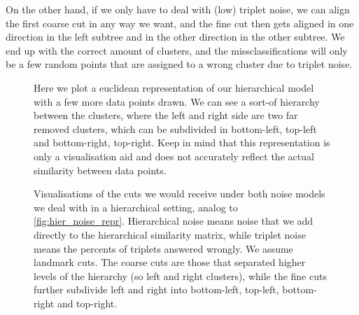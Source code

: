 On the other hand, if we only have to deal with (low) triplet noise, we can align the first coarse cut in any way we want, and the fine cut then gets aligned in one direction in the left subtree
and in the other direction in the other subtree. We end up with the correct amount of clusters, and the missclassifications will only be a few random points that are assigned to a wrong cluster due to triplet noise.


\begin{figure}[ht]
    \centering
    \resizebox{0.8\textwidth}{!}{}
    \caption{
        Here we plot a euclidean representation of our hierarchical model with a few more data points drawn. We can see a sort-of hierarchy between the clusters, where
        the left and right side are two far removed clusters, which can be subdivided in bottom-left, top-left and bottom-right, top-right.
        Keep in mind that this representation is only a visualisation aid and does not accurately reflect the actual similarity between data points.
    }
    \label{fig:hier_noise_repr}
\end{figure}


\onecolumn
\begin{figure}[ht]
    \centering
    \hfill
    \caption{
        Visualisations of the cuts we would receive under both noise models we deal with in a hierarchical setting, analog to \autoref{fig:hier_noise_repr}.
        Hierarchical noise means noise that we add directly to the hierarchical similarity matrix, while triplet noise means the 
        percents of triplets answered wrongly. We assume landmark cuts. The coarse cuts are those that separated higher levels of the hierarchy (so left and right clusters), while
        the fine cuts further subdivide left and right into bottom-left, top-left, bottom-right and top-right.
    }
    \label{fig:hier_noise_cuts}
\end{figure}

